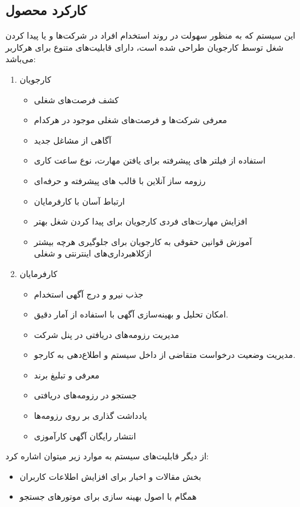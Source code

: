 \documentclass{report}
\begin{document}
			\subsection{کارکرد محصول}
				این سیستم که به منظور سهولت در روند استخدام افراد در شرکت‌ها و یا پیدا کردن شغل توسط کارجویان طراحی شده‌ است، دارای قابلیت‌های متنوع برای هرکاربر می‌باشد:
				\begin{enumerate}
					\item کارجویان
						\begin{itemize}
							\item 
							کشف فرصت‌های شغلی
							\item 
							معرفی شرکت‌ها و فرصت‌های شغلی موجود در هرکدام
							\item 
							آگاهی از مشاغل جدید
							\item 
							استفاده از فیلتر های پیشرفته برای یافتن مهارت، نوع ساعت کاری
							\item 
							رزومه ساز آنلاین با قالب های پیشرفته و حرفه‌ای
							\item 
							 ارتباط آسان با کارفرمایان
							\item 
							افزایش  مهارت‌های فردی کارجویان برای پیدا کردن شغل بهتر
							\item 
							آموزش قوانین حقوقی به کارجویان برای جلوگیری هرچه بیشتر ازکلاهبرداری‌های اینترنتی و شغلی
						\end{itemize}
					
					\item کارفرمایان
						\begin{itemize}
							\item 
							جذب نیرو و درج آگهی استخدام
							\item 
							امکان تحلیل و بهینه‌سازی آگهی با استفاده از آمار دقیق.
							\item 
							مدیریت رزومه‌های دریافتی در پنل شرکت
							\item 
							مدیریت وضعیت درخواست متقاضی از داخل سیستم و اطلاع‌دهی به کارجو.
							\item 
							معرفی و تبلیغ برند
							\item 
							جستجو در رزومه‌های دریافتی
							\item 
							یادداشت گذاری بر روی رزومه‌ها
							\item 
							انتشار رایگان آگهی‌ کارآموزی
						\end{itemize}
				\end{enumerate}
			
			از دیگر قابلیت‌های سیستم به موارد زیر میتوان اشاره کرد:
			\begin{itemize}
				\item بخش مقالات و اخبار برای افزایش اطلاعات کاربران
				\item همگام با اصول بهینه سازی برای موتورهای جستجو
			\end{itemize}
		
\end{document}

